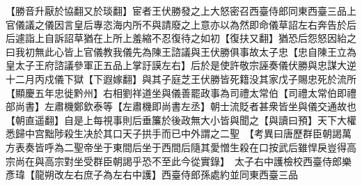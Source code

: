 【勝音升厭於協翻又於琰翻】宦者王伏勝發之上大怒密召西臺侍郎同東西臺三品上官儀議之儀因言皇后專恣海内所不與請廢之上意亦以為然即命儀草詔左右奔告於后后遽詣上自訴詔草猶在上所上羞縮不忍復待之如初【復扶又翻】猶恐后怨怒因紿之曰我初無此心皆上官儀教我儀先為陳王諮議與王伏勝俱事故太子忠【忠自陳王立為皇太子王府諮議參軍正五品上掌訏謨左右】后於是使許敬宗誣奏儀伏勝與忠謀大逆十二月丙戍儀下獄【下遐嫁翻】與其子庭芝王伏勝皆死籍没其家戊子賜忠死於流所【顯慶五年忠徙黔州】右相劉祥道坐與儀善罷政事為司禮太常伯【司禮太常伯即禮部尚書】左肅機鄭欽泰等【左肅機即尚書左丞】朝士流貶者甚衆皆坐與儀交通故也【朝直遥翻】自是上每視事則后垂簾於後政無大小皆與聞之【與讀曰預】天下大權悉歸中宫黜陟殺生决於其口天子拱手而已中外謂之二聖　【考異曰唐歷群臣朝謁萬方表奏皆呼為二聖帝坐于東間后坐于西間后隨其愛憎生殺在口按武后雖悍戾豈得高宗尚在與高宗對坐受群臣朝謁乎恐不至此今從實錄】　太子右中護檢校西臺侍郎樂彥瑋【龍朔改左右庶子為左右中護】西臺侍郎孫處約並同東西臺三品

